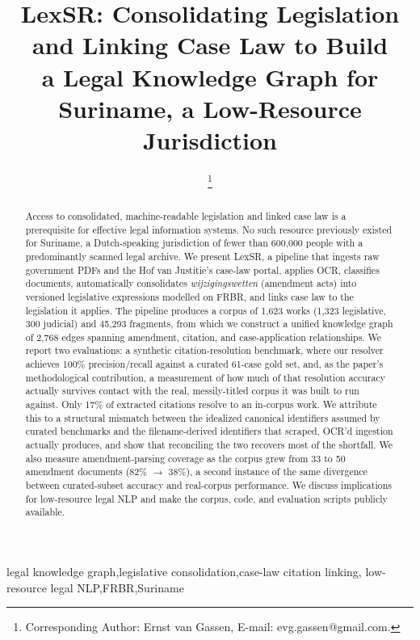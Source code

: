 \documentclass{IOS-Book-Article}
\def\hb{\hbox to 11.5 cm{}}
\begin{document}
\pagestyle{headings}
\def\thepage{}
\begin{frontmatter}

\title{LexSR: Consolidating Legislation and Linking Case Law to Build\\
a Legal Knowledge Graph for Suriname, a Low-Resource Jurisdiction}

\markboth{}{2026\hb}

\author[A]{ %
\thanks{Corresponding Author: Ernst van Gassen, E-mail: evg.gassen@gmail.com.}}

\address[A]{Independent researcher at Arktos AI Lab}

\begin{abstract}
Access to consolidated, machine-readable legislation and linked case law is a prerequisite
for effective legal information systems. No such resource previously existed for Suriname, a
Dutch-speaking jurisdiction of fewer than 600,000 people with a predominantly scanned legal
archive. We present LexSR, a pipeline that ingests raw government PDFs and
the Hof van Justitie's case-law portal, applies OCR, classifies documents, automatically
consolidates \emph{wijzigingswetten} (amendment acts) into versioned legislative expressions
modelled on FRBR, and links case law to the legislation it applies. The pipeline produces a
corpus of 1,623 works (1,323 legislative, 300 judicial) and 45,293 fragments, from
which we construct a unified knowledge graph of 2,768 edges spanning amendment,
citation, and case-application relationships. We report two evaluations: a synthetic
citation-resolution benchmark, where our resolver achieves 100\% precision/recall against a
curated 61-case gold set, and, as the paper's methodological contribution, a measurement of
how much of that resolution accuracy actually survives contact with the real, messily-titled
corpus it was built to run against. Only 17\% of extracted citations resolve to an
in-corpus work. We attribute this to a structural mismatch between the idealized canonical
identifiers assumed by curated benchmarks and the filename-derived identifiers that scraped,
OCR'd ingestion actually produces, and show that reconciling the two recovers most of the
shortfall. We also measure amendment-parsing coverage as the corpus grew
from 33 to 50 amendment documents (82\% $\rightarrow$ 38\%), a second instance of the same
divergence between curated-subset accuracy and real-corpus performance. We discuss
implications for low-resource legal NLP and make the corpus, code, and evaluation scripts
publicly available.
\end{abstract}

\begin{keyword}
legal knowledge graph\sep legislative consolidation\sep case-law citation linking\sep
low-resource legal NLP\sep FRBR\sep Suriname
\end{keyword}
\end{frontmatter}
\end{document}
